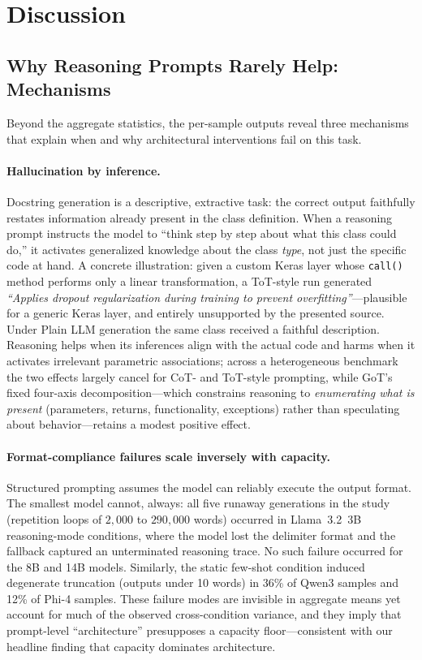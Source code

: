 \documentclass[pdflatex,sn-mathphys-ay]{sn-jnl}%
\theoremstyle{thmstyleone}%
\theoremstyle{thmstyletwo}%
\theoremstyle{thmstylethree}%
\begin{document}
{\color{blue}
\section{Discussion}
\label{sec:discussion}

\subsection{Why Reasoning Prompts Rarely Help: Mechanisms}
\label{sec:mechanisms}
Beyond the aggregate statistics, the per-sample outputs reveal three mechanisms that explain when and why architectural interventions fail on this task.

\paragraph{Hallucination by inference.}
Docstring generation is a descriptive, extractive task: the correct output faithfully restates information already present in the class definition. When a reasoning prompt instructs the model to ``think step by step about what this class could do,'' it activates generalized knowledge about the class \emph{type}, not just the specific code at hand. A concrete illustration: given a custom Keras layer whose \texttt{call()} method performs only a linear transformation, a ToT-style run generated \emph{``Applies dropout regularization during training to prevent overfitting''}---plausible for a generic Keras layer, and entirely unsupported by the presented source. Under Plain LLM generation the same class received a faithful description. Reasoning helps when its inferences align with the actual code and harms when it activates irrelevant parametric associations; across a heterogeneous benchmark the two effects largely cancel for CoT- and ToT-style prompting, while GoT's fixed four-axis decomposition---which constrains reasoning to \emph{enumerating what is present} (parameters, returns, functionality, exceptions) rather than speculating about behavior---retains a modest positive effect.

\paragraph{Format-compliance failures scale inversely with capacity.}
Structured prompting assumes the model can reliably execute the output format. The smallest model cannot, always: all five runaway generations in the study (repetition loops of $2{,}000$ to $290{,}000$ words) occurred in Llama~3.2~3B reasoning-mode conditions, where the model lost the delimiter format and the fallback captured an unterminated reasoning trace. No such failure occurred for the 8B and 14B models. Similarly, the static few-shot condition induced degenerate truncation (outputs under 10 words) in 36\% of Qwen3 samples and 12\% of Phi-4 samples. These failure modes are invisible in aggregate means yet account for much of the observed cross-condition variance, and they imply that prompt-level ``architecture'' presupposes a capacity floor---consistent with our headline finding that capacity dominates architecture.

}
\end{document}
